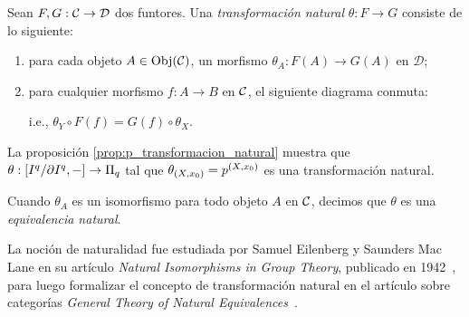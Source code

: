 \begin{definicion}
Sean $F, G: \mathcal{C} \to \mathcal{D}$ dos funtores. Una \textit{transformación natural} $\theta: F \to G$ consiste de lo siguiente:
\begin{enumerate}
    \item para cada objeto $A \in \mathrm{Obj}({\mathcal{C}})$, un morfismo $\theta_A: F(A) \to G(A)$ en $\mathcal{D}$;
    \item para cualquier morfismo $f: A \to B$ en $\mathcal{C}$, el siguiente diagrama conmuta:
    \begin{center}
\end{center}
i.e., $\theta_Y\circ F(f)=G(f)\circ\theta_X$.
\end{enumerate}
\end{definicion}
\begin{ejemplo}
    La proposición \ref{prop:p_transformacion_natural} muestra que $\theta:[I^{q}/\partial I^{q},-]\to\Pi_q$ tal que $\theta_{(X,x_0)}=p^{(X,x_0)}$ es una transformación natural.
\end{ejemplo}
\begin{nota}
    Cuando $\theta_A$ es un isomorfismo para todo objeto $A$ en $\mathcal{C}$, decimos que $\theta$ es una \textit{equivalencia natural}.
\end{nota}
La noción de naturalidad fue estudiada por Samuel Eilenberg y Saunders Mac Lane en su artículo \textit{Natural Isomorphisms in Group Theory}, publicado en 1942~\cite{EilenbergMacLane1942}, para luego formalizar el concepto de transformación natural en el artículo sobre categorías \textit{General Theory of Natural Equivalences}~\cite{EilenbergMacLane1945}.


